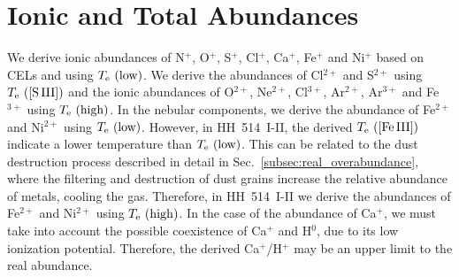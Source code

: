 \documentclass[fleqn,usenatbib]{mnras}
\newcommand{\cesar}[1]{{\color{red}C: #1}}
\begin{document}


\section{Ionic and Total Abundances}
\label{sec:ionic_total_abundances}


We derive ionic abundances of N$^{+}$, O$^{+}$, S$^{+}$, Cl$^{+}$, Ca$^{+}$, Fe$^{+}$ and Ni$^{+}$ based on CELs and using $T_{\rm e} \text{ (low)}$. We derive the abundances of Cl$^{2+}$ and S$^{2+}$ using $T_{\rm e} \text{ ([S\thinspace III])}$ and the ionic abundances of O$^{2+}$, Ne$^{2+}$, Cl$^{3+}$, Ar$^{2+}$, Ar$^{3+}$ and Fe$^{3+}$ using $T_{\rm e} \text{ (high)}$. In the nebular components, we derive the abundance of Fe$^{2+}$ and Ni$^{2+}$ using $T_{\rm e} \text{ (low)}$. However, in HH~514~I-II, the derived $T_{\rm e} \text{ ([Fe\thinspace III])}$ indicate a lower temperature than $T_{\rm e} \text{ (low)}$. This can be related to the dust destruction process described in detail in Sec.~\ref{subsec:real_overabundance}, where the filtering and destruction of dust grains increase the relative abundance of metals, cooling the gas. Therefore, in HH~514~I-II we derive the abundances of Fe$^{2+}$ and Ni$^{2+}$ using $T_{\rm e} \text{ (high)}$. In the case of the abundance of Ca$^+$, we must take into account the possible coexistence of Ca$^+$ and H$^0$, due to its low ionization potential. Therefore, the derived Ca$^+$/H$^+$ may be an upper limit to the real abundance.
\end{document}
